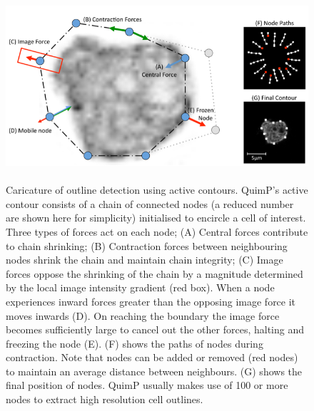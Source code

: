 \documentclass[a4paper,12pt]{article}
\begin{document}
\begin{figure}[ht]
   \centering
   \includegraphics[height=7cm]{activeContour.png} %
   \caption{Caricature of outline detection using active
contours.
QuimP's active contour consists of a chain of connected
nodes (a reduced number are shown here for simplicity) initialised
to encircle a cell of interest. Three types of forces act on each
node; (A) Central forces contribute to chain shrinking; (B) Contraction
forces between neighbouring nodes shrink the chain and maintain chain
integrity; (C) Image forces oppose the shrinking of the chain by a
magnitude determined by the local image intensity gradient (red box).
When a node experiences inward forces greater than the opposing
image force it moves inwards (D). On reaching the boundary the image force becomes
sufficiently large to cancel out the other forces, halting and freezing
the node (E). (F) shows the paths of nodes during contraction. Note
that nodes can be added or removed (red nodes) to maintain an average
distance between neighbours. (G) shows the final position of nodes.
QuimP usually makes use of 100 or more nodes to extract high resolution
cell outlines. \cite{Tyson2010}}
   \label{activeContour}
\end{figure}
\end{document}
